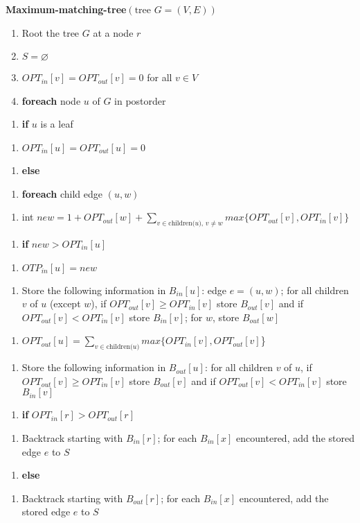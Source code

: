 \documentclass{article}
\newcommand{\modifyenum}[1]{%
  \end{enumerate}
  \begin{enumerate}[resume,#1]
}
\begin{document}
\vspace{5mm}

\textbf{Maximum-matching-tree}$(\text{tree } G = (V,E))$
\begin{enumerate}
    \item Root the tree $G$ at a node $r$
    \item $S = \varnothing$
    \item $OPT_{in}[v] = OPT_{out}[v] = 0$ for all $v \in V$
    \item \textbf{foreach} node $u$ of $G$ in postorder
    \modifyenum{leftmargin=50pt}
    \item \textbf{if} $u$ is a leaf
    \modifyenum{leftmargin=75pt}
    \item $OPT_{in}[u] = OPT_{out}[u] = 0$
    \modifyenum{leftmargin=50pt}
    \item \textbf{else}
    \modifyenum{leftmargin=75pt}
    \item \textbf{foreach} child edge $(u,w)$
    \modifyenum{leftmargin=100pt}
    \item int $new = 1 + OPT_{out}[w] +
        \sum_{v \in \text{children($u$), $v \neq w$}} max\{OPT_{out}[v],
        OPT_{in}[v]\}$
    \modifyenum{leftmargin=100pt}
    \item \textbf{if} $new > OPT_{in}[u]$
    \modifyenum{leftmargin=125pt}
    \item $OTP_{in}[u] = new$
    \modifyenum{leftmargin=125pt}
    \item Store the following information in
        $B_{in}[u]$: edge $e = (u,w)$; for all children $v$ of $u$ (except $w$),
        if $OPT_{out}[v] \geq OPT_{in}[v]$ store $B_{out}[v]$ and
        if $OPT_{out}[v] < OPT_{in}[v]$ store $B_{in}[v]$; for $w$, store
        $B_{out}[w]$
    \modifyenum{leftmargin=75pt}
    \item $OPT_{out}[u] =
        \sum_{v \in \text{children($u$)}} max\{OPT_{in}[v], OPT_{out}[v]$\}
    \modifyenum{leftmargin=75pt}
    \item Store the following information in
        $B_{out}[u]$: for all children $v$ of $u$,
        if $OPT_{out}[v] \geq OPT_{in}[v]$ store $B_{out}[v]$ and
        if $OPT_{out}[v] < OPT_{in}[v]$ store $B_{in}[v]$
    \modifyenum{leftmargin=25pt}
    \item \textbf{if} $OPT_{in}[r] > OPT_{out}[r]$
    \modifyenum{leftmargin=50pt}
    \item Backtrack starting with $B_{in}[r]$; for
        each $B_{in}[x]$ encountered, add the stored edge $e$ to $S$
    \modifyenum{leftmargin=25pt}
    \item \textbf{else}
    \modifyenum{leftmargin=50pt}
    \item Backtrack starting with $B_{out}[r]$; for each $B_{in}[x]$ encountered,
        add the stored edge $e$ to $S$
\end{enumerate}
\end{document}

